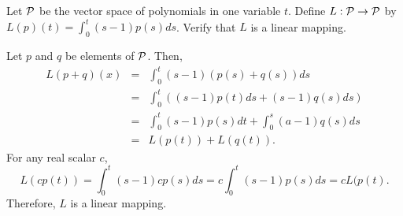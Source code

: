 \documentclass{ximera}
\begin{document}
\begin{exercise} \label{c7.2.6}
Let ${\cal P}$ be the vector space of polynomials in one variable
$t$.  Define $L:{\cal P}\to {\cal P}$ by $L(p)(t)=\int_0^t(s-1)p(s)ds$.
Verify that $L$ is a linear mapping.

\begin{solution}

Let $p$ and $q$ be elements of ${\cal P}$.  Then,
\[ 
\begin{array}{rcl}
L(p + q)(x) & = & \int_0^t(s - 1)(p(s) + q(s))ds \\
& = & \int_0^t ((s - 1)p(t)ds + (s - 1)q(s)ds) \\
& = & \int_0^t (s - 1)p(s)dt + \int_0^s (a - 1)q(s)ds \\
& = & L(p(t)) + L(q(t)). 
\end{array} 
\]
For any real scalar $c$,
\[ 
L(cp(t)) = \int_0^t (s - 1)cp(s)ds = c\int_0^t (s - 1)p(s)ds = cL(p(t). 
\]
Therefore, $L$ is a linear mapping.


\end{solution}
\end{exercise}
\end{document}

